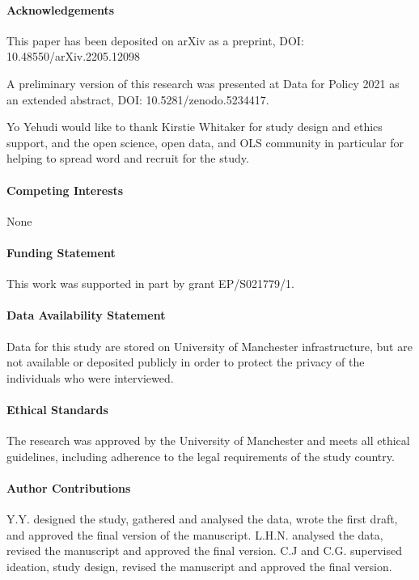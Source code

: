 \documentclass{CUP-JNL-DAP}%
\begin{document}
\begin{Backmatter}

\paragraph{Acknowledgements}
This paper has been deposited on arXiv as a preprint, DOI: 10.48550/arXiv.2205.12098

A preliminary version of this research was presented at Data for Policy 2021 as an extended abstract, DOI: 10.5281/zenodo.5234417. 

Yo Yehudi would like to thank Kirstie Whitaker for study design and ethics support, and the open science, open data, and OLS community in particular for helping to spread word and recruit for the study.

\paragraph{Competing Interests}
None

\paragraph{Funding Statement}
This work was supported in part by grant EP/S021779/1.

\paragraph{Data Availability Statement}
Data for this study are stored on University of Manchester infrastructure, but are not available or deposited publicly in order to protect the privacy of the individuals who were interviewed.

\paragraph{Ethical Standards}
The research was approved by the University of Manchester and meets all ethical guidelines, including adherence to the legal requirements of the study country.

\paragraph{Author Contributions}
Y.Y. designed the study, gathered and analysed the data, wrote the first draft, and approved the final version of the manuscript. L.H.N. analysed the data, revised the manuscript and approved the final version. C.J and C.G. supervised ideation, study design, revised the manuscript and approved the final version. 


\end{Backmatter}
\end{document}
